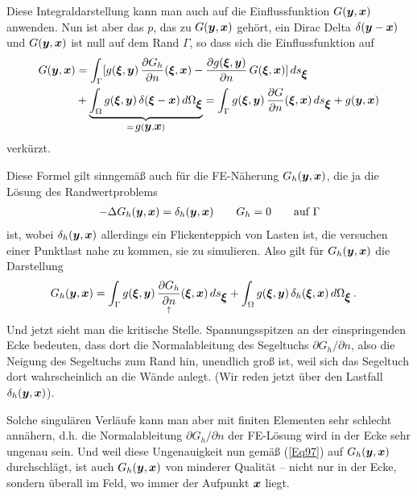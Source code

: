 {Diese Integraldarstellung kann man auch auf die Einflussfunktion $G(\mbox{\boldmath $y$},\mbox{\boldmath $x$})$ anwenden. Nun ist aber das $p$, das zu $G(\mbox{\boldmath $y$},\mbox{\boldmath $x$})$ geh\"{o}rt, ein Dirac Delta $\delta(\mbox{\boldmath $y$}-\mbox{\boldmath $x$})$ und $G(\mbox{\boldmath $y$},\mbox{\boldmath $x$})$ ist null auf dem Rand $\Gamma$, so dass sich die Einflussfunktion auf
\begin{align}
G(\mbox{\boldmath $y$},\mbox{\boldmath $x$}) &=  \int_{\Gamma}[ g(\mbox{\boldmath $\xi$},\mbox{\boldmath $y$})\,\frac{\partial G_h}{\partial n}(\mbox{\boldmath $\xi$}, \mbox{\boldmath $x$}) - \frac{\partial g(\mbox{\boldmath $\xi$},\mbox{\boldmath $y$})}{\partial n}\,G(\mbox{\boldmath $\xi$}, \mbox{\boldmath $x$})]\,ds_{\mbox{\boldmath $\xi$}} \nonumber \\ &+ \underbrace{\int_{\Omega} g(\mbox{\boldmath $\xi$},\mbox{\boldmath $y$})\, \delta(\mbox{\boldmath $\xi$} - \mbox{\boldmath $x$})\,d\Omega_{\mbox{\boldmath $\xi$}}}_{= \,{\displaystyle g}(\mbox{\boldmath $y$},\mbox{\boldmath $x$})}
=  \int_{\Gamma} g(\mbox{\boldmath $\xi$},\mbox{\boldmath $y$})\,\frac{\partial G}{\partial n}(\mbox{\boldmath $\xi$}, \mbox{\boldmath $x$})\,ds_{\mbox{\boldmath $\xi$}} + g(\mbox{\boldmath $y$},\mbox{\boldmath $x$})
\end{align}
verk\"{u}rzt.

Diese Formel gilt sinngem\"{a}{\ss} auch f\"{u}r die FE-N\"{a}herung $G_h(\mbox{\boldmath $y$},\mbox{\boldmath $x$})$, die ja die L\"{o}sung des Randwertproblems
\begin{align}
- \Delta G_h(\mbox{\boldmath $y$},\mbox{\boldmath $x$}) = \delta_h(\mbox{\boldmath $y$},\mbox{\boldmath $x$}) \qquad G_h = 0 \qquad \text{auf $\Gamma$}
\end{align}
ist, wobei $\delta_h(\mbox{\boldmath $y$},\mbox{\boldmath $x$})$ allerdings ein Flickenteppich von Lasten ist, die versuchen einer Punktlast nahe zu kommen, sie zu simulieren. Also gilt f\"{u}r $G_h(\mbox{\boldmath $y$},\mbox{\boldmath $x$})$ die Darstellung
\begin{align}\label{Eq97}
G_h(\mbox{\boldmath $y$},\mbox{\boldmath $x$}) &=  \int_{\Gamma} g(\mbox{\boldmath $\xi$},\mbox{\boldmath $y$})\,\underset{\uparrow}{\frac{\partial G_h}{\partial n}}(\mbox{\boldmath $\xi$}, \mbox{\boldmath $x$})\,ds_{\mbox{\boldmath $\xi$}} + \int_{\Omega}g(\mbox{\boldmath $\xi$},\mbox{\boldmath $y$}) \,\delta_h(\mbox{\boldmath $\xi$},\mbox{\boldmath $x$})\,d\Omega_{\mbox{\boldmath $\xi$}}\,.
\end{align}
Und jetzt sieht man die kritische Stelle. Spannungsspitzen an der einspringenden Ecke bedeuten, dass dort die Normalableitung des Segeltuchs $\partial G_h/ \partial n$,
also die Neigung des Segeltuchs zum Rand hin, unendlich gro{\ss} ist, weil sich das Segeltuch dort wahrscheinlich an die W\"{a}nde anlegt. (Wir reden jetzt \"{u}ber den Lastfall $\delta_h(\mbox{\boldmath $y$},\mbox{\boldmath $x$})$).

Solche singul\"{a}ren Verl\"{a}ufe kann man aber mit finiten Elementen sehr schlecht ann\"{a}hern, d.h. die Normalableitung $\partial G_h/\partial n$ der FE-L\"{o}sung wird in der  Ecke sehr ungenau sein. Und weil diese Ungenauigkeit nun gem\"{a}{\ss} (\ref{Eq97}) auf $G_h(\mbox{\boldmath $y$},\mbox{\boldmath $x$})$ durchschl\"{a}gt, ist auch $G_h(\mbox{\boldmath $y$},\mbox{\boldmath $x$})$ von minderer Qualit\"{a}t -- nicht nur in der Ecke, sondern \"{u}berall im Feld, wo immer der Aufpunkt $\mbox{\boldmath $x$}$ liegt.

}
